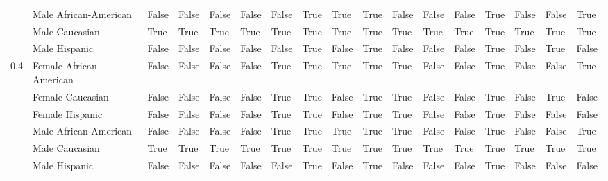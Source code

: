 \begin{tabular}{lllllllllllllllll}
    & Male African-American &         False &                False &                  False &       False &           False &              True &        True &        True &       False &               False &          False &           True &       False &       False &        True \\
    & Male Caucasian &          True &                 True &                   True &        True &            True &              True &        True &        True &        True &                True &           True &           True &        True &        True &        True \\
    & Male Hispanic &         False &                False &                  False &       False &           False &              True &       False &        True &       False &               False &          False &           True &       False &        True &       False \\
0.4 & Female African-American &         False &                False &                  False &       False &            True &              True &        True &        True &        True &               False &          False &           True &       False &       False &        True \\
    & Female Caucasian &         False &                False &                  False &       False &            True &              True &       False &        True &        True &               False &          False &           True &       False &        True &       False \\
    & Female Hispanic &         False &                False &                  False &       False &            True &              True &       False &        True &        True &               False &          False &           True &       False &       False &       False \\
    & Male African-American &         False &                False &                  False &       False &            True &              True &        True &        True &        True &               False &          False &           True &       False &       False &        True \\
    & Male Caucasian &          True &                 True &                   True &        True &            True &              True &        True &        True &        True &                True &           True &           True &        True &        True &        True \\
    & Male Hispanic &         False &                False &                  False &       False &           False &              True &       False &        True &       False &               False &          False &           True &       False &       False &       False \\
\bottomrule
\end{tabular}
